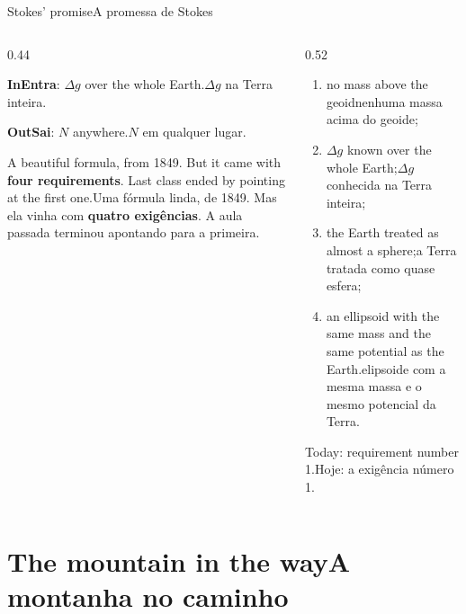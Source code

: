 \documentclass[aspectratio=169,11pt]{beamer}
\newcommand{\tr}[2]{\ifEN#2\else#1\fi}
\newcommand{\bnum}[1]{\textbf{\textcolor{mTeal}{#1}}}
\begin{document}
\begin{frame}{\tr{A promessa de Stokes}{Stokes' promise}}
  \begin{columns}[T]
    \begin{column}{0.44\textwidth}
      \begin{regra}[title={\tr{O problema de Stokes, em uma linha}{Stokes' problem, in one
        line}}]
        \textbf{\tr{Entra}{In}}: \tr{$\Delta g$ na Terra inteira.}{$\Delta g$ over the whole
        Earth.}
        \medskip

        \textbf{\tr{Sai}{Out}}: \tr{$N$ em qualquer lugar.}{$N$ anywhere.}
      \end{regra}
      \medskip
      \tr{Uma fórmula linda, de 1849. Mas ela vinha com \bnum{quatro exigências}. A aula passada
      terminou apontando para a primeira.}{A beautiful formula, from 1849. But it came with
      \bnum{four requirements}. Last class ended by pointing at the first one.}
    \end{column}
    \begin{column}{0.52\textwidth}
      \begin{cuidado}[title={\tr{Para a fórmula valer}{For the formula to hold}}]
        \small
        \begin{enumerate}
          \item \alert{\tr{nenhuma massa acima do geoide}{no mass above the geoid}};
          \item \tr{$\Delta g$ conhecida na Terra inteira;}{$\Delta g$ known over the whole
                Earth;}
          \item \tr{a Terra tratada como quase esfera;}{the Earth treated as almost a
                sphere;}
          \item \tr{elipsoide com a mesma massa e o mesmo potencial da Terra.}{an ellipsoid
                with the same mass and the same potential as the Earth.}
        \end{enumerate}
      \end{cuidado}
      \medskip
      \centering
      \tr{Hoje: \alert{a exigência número 1}.}{Today: \alert{requirement number 1}.}
    \end{column}
  \end{columns}
\end{frame}

\section{\tr{A montanha no caminho}{The mountain in the way}}
\end{document}
